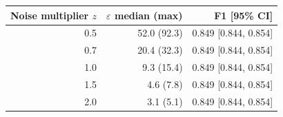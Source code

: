 \begin{tabular}{rrr}
\toprule
Noise multiplier $z$ & $\varepsilon$ median (max) & F1 [95\% CI] \\
\midrule
0.5 & 52.0 (92.3) & 0.849 [0.844, 0.854] \\
0.7 & 20.4 (32.3) & 0.849 [0.844, 0.854] \\
1.0 & 9.3 (15.4) & 0.849 [0.844, 0.854] \\
1.5 & 4.6 (7.8) & 0.849 [0.844, 0.854] \\
2.0 & 3.1 (5.1) & 0.849 [0.844, 0.854] \\
\bottomrule
\end{tabular}

